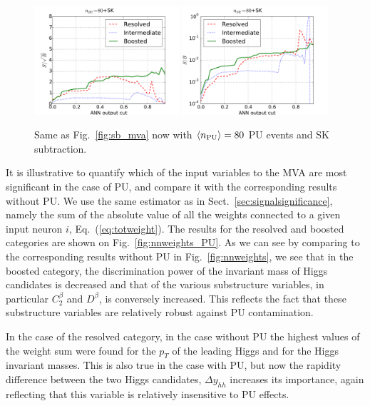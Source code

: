\begin{figure}[t]
\begin{center}
\includegraphics[width=0.48\textwidth]{plots/ssb_SKPU80.pdf}
\includegraphics[width=0.48\textwidth]{plots/sb_SKPU80.pdf}
\caption{\small Same as Fig.~\ref{fig:sb_mva}
  now
  with  $\left\langle n_{\rm PU}\right\rangle=80$ PU events 
  and SK subtraction.
}
\label{fig:sb_mva_PU}
\end{center}
\end{figure}

It is illustrative to quantify which of the input variables
to the MVA are most significant in the case of PU,
and compare it with the corresponding
results without PU.
%
We use the same estimator as in Sect.~\ref{sec:signalsignificance},
namely the sum
of the absolute value of all the weights connected to a given
input neuron $i$, Eq.~(\ref{eq:totweight}).
%
The results for the resolved and boosted categories are shown
on Fig.~\ref{fig:nnweights_PU}.
%
As we can see by comparing to the corresponding
results without PU in Fig.~\ref{fig:nnweights}, we see that
in the boosted category, the discrimination power of the invariant
mass of Higgs candidates is decreased and that of the various substructure
variables, in particular $C_2^{\beta}$ and
$D^{{\beta}}$, is conversely
increased.
%
This reflects the fact that these substructure variables are
relatively robust against PU contamination.

In the case of the resolved category, in the case without PU the highest
values of the weight sum were found for the $p_T$ of the leading
Higgs and for the Higgs invariant masses.
%
This is also true in the case with PU, but now the rapidity difference
between the two Higgs candidates, $\Delta y_{hh}$ increases its
importance, again reflecting that this variable is relatively
insensitive to PU effects.

